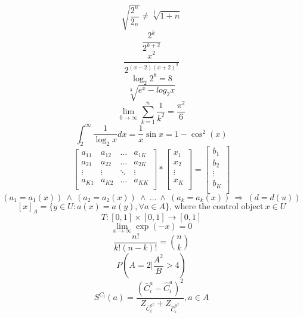 \documentclass[a4paper]{article}
\begin{document}
$$ \sqrt{ \frac{2^{n}}{2_n}} \neq \sqrt[\frac{1}{3}]{1+n} $$
\newline
$$ \frac{2^{k}}{2^{k+2}} $$
\newline
$$ \frac{x^{2}}{2^{(x-2)(x+2)^3}} $$
\newline
$$ \log_2{2^8} = 8 $$
\newline
$$ \sqrt[3]{ e^{x} - log_2{x}} $$
\newline
$$ \lim_{0\to\infty} \sum_{k=1}^{n} \frac{1}{k^{2}} = \frac{\pi^{2}}{6}  $$
\newline
$$ \int_{2}^{\infty} \frac{1}{\log_{2}{x}}{dx} = \frac{1}{x}\sin{x} = {1} - {\cos^{2}{(x)}}$$
\newline
$$ \left[ \begin{array}{cccc}
a_{11} & a_{12} & \ldots & a_{1K} \\
a_{21} & a_{22} & \ldots & a_{2K} \\
\vdots & \vdots & \ddots & \vdots\\
a_{K1} & a_{K2} & \ldots & a_{KK} \\
\end{array} \right] 
* 
\left [\begin{array}{c}
x_{1} \\
x_{2} \\
\vdots \\
x_{K} \\
\end{array} \right]
=
\left [\begin{array}{c}
b_{1} \\
b_{2} \\
\vdots \\
b_{K} \\
\end{array} \right]$$
\newline
$$ {(a_1 = a_1(x))} \ \wedge \ {(a_2 = a_2(x))} \ \wedge \ \ldots \ \wedge \ {(a_k = a_k(x))} \ \Rightarrow \ {(d=d(u))}$$
\newline
$$ [x]_{A} = \{y \in {U} : {a(x)} = {a(y)}, \forall{a} \in {A} \} \textrm{, \ where the control object} \ {x} \in {U}$$
\newline
$$ {T} : {[0,1]} \times {[0,1]} \rightarrow {[0,1]} $$
\newline
$$ \lim_{x\to\infty} \exp(-x) = {0} $$
\newline
$$ \frac{n!}{k!(n-k)!} = {{n} \choose {k}} $$
\newline
$$ {P \left(A=2| \frac{A^{2}}{B} > 4 \right)} $$
\newline
$$ S^{C_i}{(a)} = \frac{(\bar{C}_{i}^{a}-\hat{C}_{i}^{a})^2}{Z_{\bar{C}_{i}^{a^{2}}}+Z_{\hat{C}_{i}^{a^{2}}}}, {a} \in {A}$$
\end{document}
